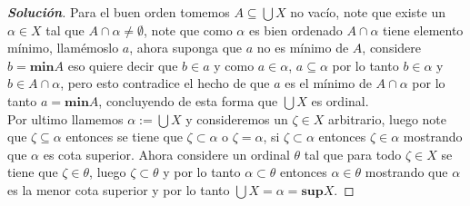 \documentclass[11pt]{article}
\numberwithin{equation}{section}
\numberwithin{figure}{section}
\begin{document}
\begin{enumerate}
\begin{proof}[\textbf{Solución}]
    Para el buen orden tomemos $A\subseteq\bigcup X$ no vacío, note que existe un $\alpha\in X$ tal que $A\cap\alpha\neq\emptyset$, note que como $\alpha$ es bien ordenado $A\cap\alpha$ tiene elemento mínimo, llamémoslo $a$, ahora suponga que $a$ no es mínimo de $A$, considere $b=\textbf{min}A$ eso quiere decir que $b\in a$ y como $a\in\alpha$, $a\subseteq\alpha$ por lo tanto $b\in\alpha$ y $b\in A\cap\alpha$, pero esto contradice  el hecho de que $a$ es el mínimo de $A\cap\alpha$ por lo tanto $a=\textbf{min}A$, concluyendo de esta forma que $\bigcup X$ es ordinal.\\
    Por ultimo llamemos $\alpha:=\bigcup X$ y consideremos un $\zeta\in X$ arbitrario, luego note que $\zeta\subseteq\alpha$ entonces se tiene que $\zeta\subset\alpha$ o $\zeta=\alpha$, si $\zeta\subset\alpha$ entonces $\zeta\in\alpha$ mostrando que $\alpha$ es cota superior. Ahora considere un ordinal $\theta$ tal que para todo $\zeta\in X$ se tiene que $\zeta\in\theta$, luego $\zeta\subset\theta$ y por lo tanto $\alpha\subset\theta$ entonces $\alpha\in\theta$ mostrando que $\alpha$ es la menor cota superior y por lo tanto $\bigcup X=\alpha=\textbf{sup}X$.
    

\end{proof}
\end{enumerate}
\end{document}
